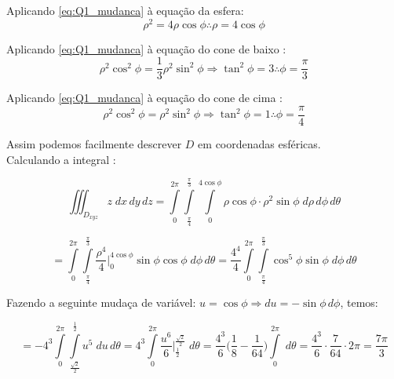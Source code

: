 \documentclass[12pt,a4paper]{article}
\begin{document}
Aplicando \eqref{eq:Q1_mudanca} \`a equaç\~{a}o da esfera:
\begin{equation}
\rho^2 = 4\rho\cos\phi \therefore \rho = 4\cos\phi
\label{eq:Q1_elipsoide}
\end{equation}

Aplicando \eqref{eq:Q1_mudanca} \`a equaç\~{a}o do cone de baixo :
\begin{equation}
\rho^2\cos^2\phi = \frac{1}{3} \rho^ 2 \sin^2\phi \Rightarrow \tan^2 \phi = 3 \therefore \phi = \frac{\pi}{3}
\label{eq:Q1_cone}
\end{equation}

Aplicando \eqref{eq:Q1_mudanca} \`a equaç\~{a}o do cone de cima :
\begin{equation}
\rho^2\cos^2\phi =  \rho^ 2 \sin^2\phi \Rightarrow \tan^2 \phi = 1 \therefore \phi = \frac{\pi}{4}
\label{eq:Q1_cone2}
\end{equation}


Assim podemos facilmente descrever $D$ em coordenadas esf\'{e}ricas. \\

Calculando a integral : \

$$ \iiint_{D_{xyz}}{z}\;dx\,dy\,dz  = \int\limits_{0}^{2\pi} \int\limits_{\frac{\pi}{4}}^{\frac{\pi}{3}}  \int\limits_{0}^{4\cos\phi} \rho \cos \phi \cdot \rho^2 \sin\phi \;d\rho\, d\phi\,d\theta $$

$$ = \int\limits_{0}^{2\pi} \int\limits_{\frac{\pi}{4}}^{\frac{\pi}{3}}  \frac{\rho^4}{4} \Big|_{0}^{4\cos\phi} \sin \phi \cos \phi \;d\phi\,d\theta = \frac{4^4}{4} \int\limits_{0}^{2\pi} \int\limits_{\frac{\pi}{4}}^{\frac{\pi}{3}}  \cos^5\phi \sin \phi \;d\phi\,d\theta  $$

Fazendo a seguinte mudaça de variável: $u = \cos\phi \Rightarrow du = -\sin\phi \, d\phi $, temos:

$$ = -4^3 \int\limits_{0}^{2\pi} \int\limits_{\frac{\sqrt{2}}{2}}^{\frac{1}{2}}  u^5 \;du\,d\theta = 4^3 \int\limits_{0}^{2\pi}  \frac{u^6}{6} \Big|_{\frac{1}{2}}^{\frac{\sqrt{2}}{2}} \;d\theta = \frac{4^3}{6} \Big( \frac{1}{8} - \frac{1}{64} \Big) \int\limits_{0}^{2\pi} \; d\theta= \frac{4^3}{6} \cdot \frac{7}{64} \cdot 2 \pi = \frac{7\pi}{3} $$
\end{document}
